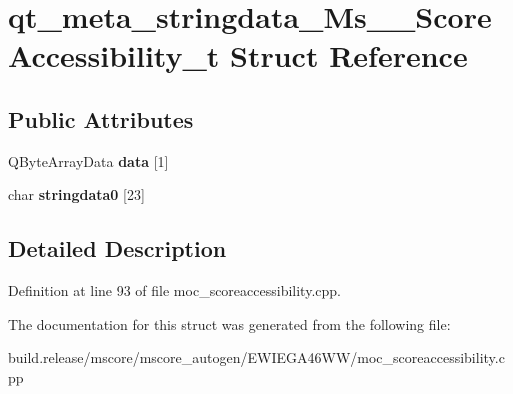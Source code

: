 \hypertarget{structqt__meta__stringdata___ms_____score_accessibility__t}{}\section{qt\+\_\+meta\+\_\+stringdata\+\_\+\+Ms\+\_\+\+\_\+\+Score\+Accessibility\+\_\+t Struct Reference}
\label{structqt__meta__stringdata___ms_____score_accessibility__t}
\subsection*{Public Attributes}
\begin{DoxyCompactItemize}
\item 
\mbox{\label{structqt__meta__stringdata___ms_____score_accessibility__t_a1639c2462959e34b3739fce9686c562a}} 
Q\+Byte\+Array\+Data {\bfseries data} \mbox{[}1\mbox{]}
\item 
\mbox{\label{structqt__meta__stringdata___ms_____score_accessibility__t_a6a201d10d30f25d77bc919f776815876}} 
char {\bfseries stringdata0} \mbox{[}23\mbox{]}
\end{DoxyCompactItemize}


\subsection{Detailed Description}


Definition at line 93 of file moc\+\_\+scoreaccessibility.\+cpp.



The documentation for this struct was generated from the following file\+:\begin{DoxyCompactItemize}
\item 
build.\+release/mscore/mscore\+\_\+autogen/\+E\+W\+I\+E\+G\+A46\+W\+W/moc\+\_\+scoreaccessibility.\+cpp\end{DoxyCompactItemize}
